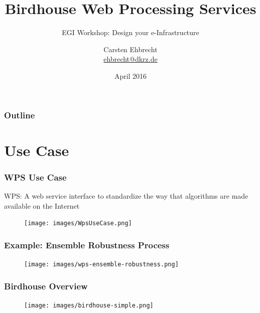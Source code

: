 \documentclass{beamer}
\title{Birdhouse Web Processing Services}
\subtitle{EGI Workshop: Design your e-Infrastructure}
\author{
Carsten Ehbrecht\\
\medskip
{\scriptsize \url{ehbrecht@dkrz.de}}
}
\institute{German Climate Computing Center (DKRZ)}
\date{April 2016}
\begin{document}

  \begin{frame}[plain]
    \titlepage
  \end{frame}


  {
    \begin{frame} %
      \frametitle{Outline}
      \tableofcontents[subsectionstyle=hide/hide]
    \end{frame}
  }


  \section{Use Case}



  \begin{frame}
    \frametitle{WPS Use Case}
    WPS: A web service interface to standardize the way that algorithms are made available on the Internet
    \begin{figure}
      \texttt{[image: images/WpsUseCase.png]}
    \end{figure}
  \end{frame}


  \begin{frame}
    \frametitle{Example: Ensemble Robustness Process}
    \begin{figure}
      \texttt{[image: images/wps-ensemble-robustness.png]}
    \end{figure}
  \end{frame}


  \begin{frame}
    \frametitle{Birdhouse Overview}
    \begin{figure}
      \texttt{[image: images/birdhouse-simple.png]}
    \end{figure}
  \end{frame}
\end{document}
